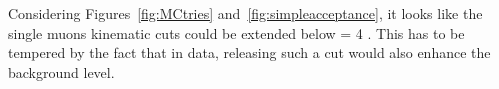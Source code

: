 Considering Figures~\ref{fig:MCtries} and~\ref{fig:simpleacceptance},
it looks like the single muons kinematic cuts could be extended below
\pt = 4 \GeVc. %
This has to be tempered by the fact that in data, releasing
such a cut would also enhance the background level.

